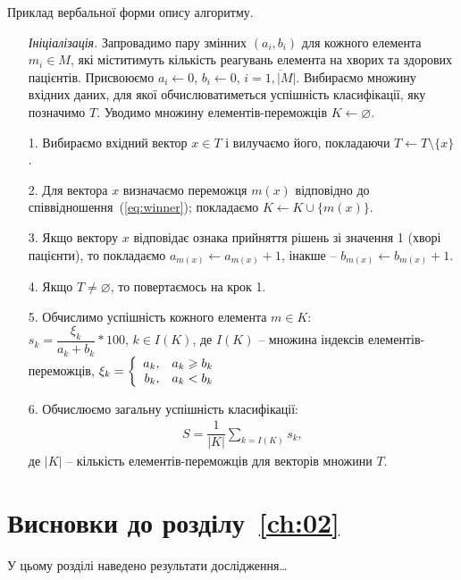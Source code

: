 \begin{algorithm}[!htb]
\caption{Приклад вербальної форми опису алгоритму.}\label{alg:classifier}
\begin{enumerate}
\item[ ]\emph{Ініціалізація.} Запровадимо пару змінних $(a_i,b_i)$ для кожного елемента $m_i\in M$, які міститимуть кількість реагувань елемента на хворих та здорових пацієнтів. Присвоюємо $a_i\leftarrow 0$, $b_i\leftarrow 0$, $i=\overline{1,|M|}$. Вибираємо множину вхідних даних, для якої обчислюватиметься успішність класифікації, яку позначимо $T$. Уводимо множину елементів-переможців $K\leftarrow\varnothing$.
\item[1.] Вибираємо вхідний вектор $x\in T$ і вилучаємо його, покладаючи $T\leftarrow T\setminus\{x\}$.
\item[2.] Для вектора $x$ визначаємо переможця $m(x)$ відповідно до співвідношення~(\ref{eq:winner}); покладаємо $K\leftarrow K\cup\{m(x)\}$.
\item[3.] Якщо вектору $x$ відповідає ознака прийняття рішень зі значення 1 (хворі пацієнти), то покладаємо $a_{m(x)}\leftarrow a_{m(x)} + 1$, інакше -- $b_{m(x)}\leftarrow b_{m(x)} + 1$.
\item[4.] Якщо $T\neq \varnothing$, то повертаємось на крок 1.
\item[5.] Обчислимо успішність кожного елемента $m\in K$:\\$s_k=\dfrac{\xi_k}{a_k + b_k}*100$, $k\in I(K)$, де $I(K)$ -- множина індексів елементів-переможців, $\xi_k=\left\{\begin{array}{r@{,\quad}l}a_k & a_k\geq b_k \\ b_k & a_k < b_k\end{array}\right.$
\item[6.] Обчислюємо загальну успішність класифікації: \begin{eqnarray*}S=\dfrac{1}{|K|}\sum_{k=I(K)}s_k,\end{eqnarray*} де $|K|$ -- кількість елементів-переможців для векторів множини $T$.
\end{enumerate}
\end{algorithm}

\section{Висновки до розділу~\ref{ch:02}}
У цьому розділі наведено результати дослідження\ldots